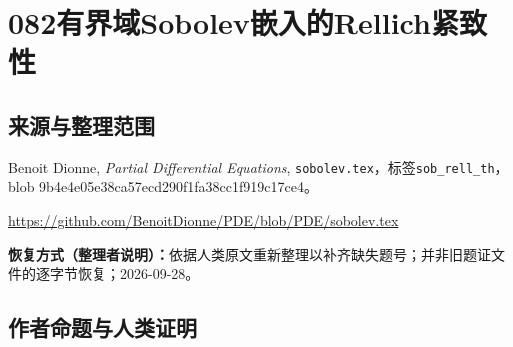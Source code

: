 \documentclass[UTF8,11pt]{ctexart}
\theoremstyle{definition}
\begin{document}
\section*{082\quad 有界域Sobolev嵌入的Rellich紧致性}
\subsection*{来源与整理范围}
Benoit Dionne, \emph{Partial Differential Equations}, \texttt{sobolev.tex}，标签\texttt{sob\_rell\_th}，blob 9b4e4e05e38ca57ecd290f1fa38cc1f919c17ce4。
\par\url{https://github.com/BenoitDionne/PDE/blob/PDE/sobolev.tex}
\par\textbf{恢复方式（整理者说明）：}依据人类原文重新整理以补齐缺失题号；并非旧题证文件的逐字节恢复；2026-09-28。
\subsection*{作者命题与人类证明}
\end{document}

